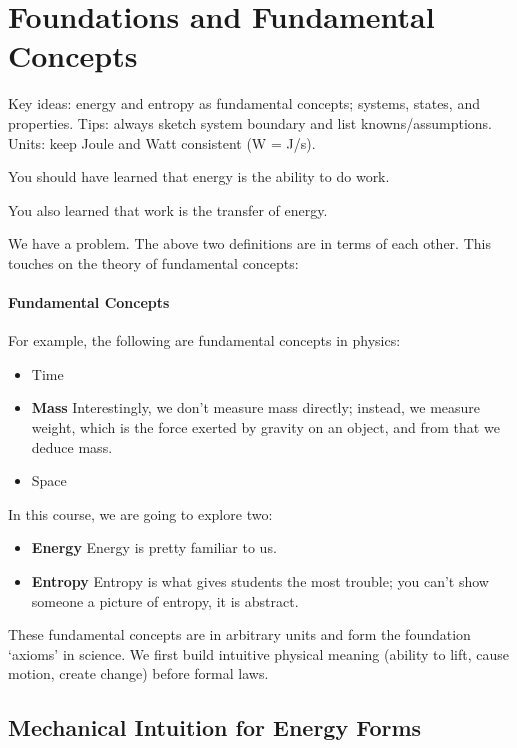 \documentclass[11pt]{report}
\begin{document}
\section{Foundations and Fundamental Concepts}
\begin{review}
Key ideas: energy and entropy as fundamental concepts; systems, states, and properties. Tips: always sketch system boundary and list knowns/assumptions. Units: keep Joule and Watt consistent (W = J/s).
\end{review}
\begin{definition}[Energy]
    You should have learned that energy is the ability to do work.
\end{definition}


\begin{definition}[Work]
    You also learned that work is the transfer of energy.
\end{definition}

We have a problem. The above two definitions are in terms of each other. This touches on the theory of fundamental concepts:

\paragraph{Fundamental Concepts} For example, the following are fundamental concepts in physics:
\begin{itemize}
    \item Time
    \item \textbf{Mass} Interestingly, we don't measure mass directly; instead, we measure weight, which is the force exerted by gravity on an object, and from that we deduce mass.
    \item Space
\end{itemize}
In this course, we are going to explore two:
\begin{itemize}
    \item \textbf{Energy} Energy is pretty familiar to us. 
    \item \textbf{Entropy} Entropy is what gives students the most trouble; you can't show someone a picture of entropy, it is abstract.
\end{itemize}

These fundamental concepts are in arbitrary units and form the foundation `axioms' in science. We first build intuitive physical meaning (ability to lift, cause motion, create change) before formal laws.

\subsection{Mechanical Intuition for Energy Forms}
\end{document}
